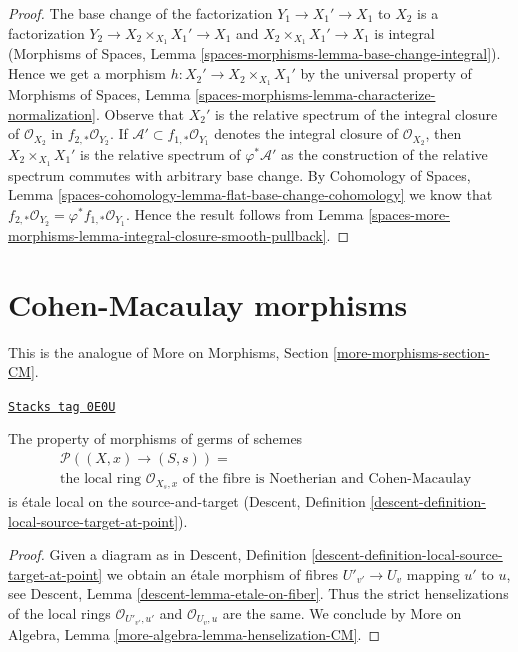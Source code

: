 \begin{proof}
The base change of the factorization $Y_1 \to X_1' \to X_1$ to $X_2$
is a factorization $Y_2 \to X_2 \times_{X_1} X_1' \to X_1$ and
$X_2 \times_{X_1} X_1' \to X_1$ is integral
(Morphisms of Spaces, Lemma \ref{spaces-morphisms-lemma-base-change-integral}).
Hence we get a morphism
$h : X_2' \to X_2 \times_{X_1} X_1'$ by the universal property of
Morphisms of Spaces, Lemma
\ref{spaces-morphisms-lemma-characterize-normalization}.
Observe that $X_2'$ is the relative spectrum of the integral closure
of $\mathcal{O}_{X_2}$ in $f_{2, *}\mathcal{O}_{Y_2}$.
If $\mathcal{A}' \subset f_{1, *}\mathcal{O}_{Y_1}$ denotes the integral
closure of $\mathcal{O}_{X_2}$, then $X_2 \times_{X_1} X_1'$ is the
relative spectrum of $\varphi^*\mathcal{A}'$ as the construction of
the relative spectrum commutes with arbitrary base change. By
Cohomology of Spaces, Lemma
\ref{spaces-cohomology-lemma-flat-base-change-cohomology}
we know that $f_{2, *}\mathcal{O}_{Y_2} = \varphi^*f_{1, *}\mathcal{O}_{Y_1}$.
Hence the result follows from
Lemma \ref{spaces-more-morphisms-lemma-integral-closure-smooth-pullback}.
\end{proof}

\section{Cohen-Macaulay morphisms}
\label{spaces-more-morphisms-section-CM}
This is the analogue of More on Morphisms, Section
\ref{more-morphisms-section-CM}.

\begin{lemma}
\label{spaces-more-morphisms-lemma-CM-local-ring-fibre}
\href{https://stacks.math.columbia.edu/tag/0E0U}{\texttt{Stacks tag 0E0U}}

The property of morphisms of germs of schemes
\begin{align*}
& \mathcal{P}((X, x) \to (S, s)) = \\
& \text{the local ring }
\mathcal{O}_{X_s, x}
\text{ of the fibre is Noetherian and Cohen-Macaulay}
\end{align*}
is \'etale local on the source-and-target (Descent, Definition
\ref{descent-definition-local-source-target-at-point}).
\end{lemma}

\begin{proof}
Given a diagram as in
Descent, Definition \ref{descent-definition-local-source-target-at-point}
we obtain an \'etale morphism of fibres
$U'_{v'} \to U_v$ mapping $u'$ to $u$, see
Descent, Lemma \ref{descent-lemma-etale-on-fiber}.
Thus the strict henselizations of the local rings
$\mathcal{O}_{U'_{v'}, u'}$ and $\mathcal{O}_{U_v, u}$
are the same. We conclude by
More on Algebra, Lemma \ref{more-algebra-lemma-henselization-CM}.
\end{proof}

